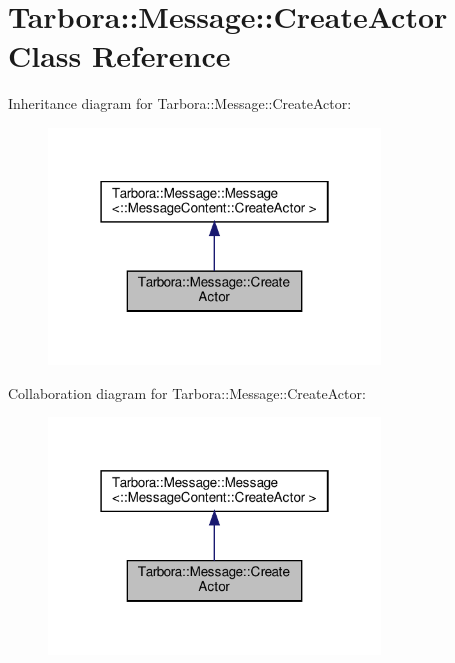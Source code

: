 \hypertarget{classTarbora_1_1Message_1_1CreateActor}{}\section{Tarbora\+:\+:Message\+:\+:Create\+Actor Class Reference}
\label{classTarbora_1_1Message_1_1CreateActor}


Inheritance diagram for Tarbora\+:\+:Message\+:\+:Create\+Actor\+:\nopagebreak
\begin{figure}[H]
\begin{center}
\leavevmode
\includegraphics[width=250pt]{classTarbora_1_1Message_1_1CreateActor__inherit__graph}
\end{center}
\end{figure}


Collaboration diagram for Tarbora\+:\+:Message\+:\+:Create\+Actor\+:\nopagebreak
\begin{figure}[H]
\begin{center}
\leavevmode
\includegraphics[width=250pt]{classTarbora_1_1Message_1_1CreateActor__coll__graph}
\end{center}
\end{figure}
